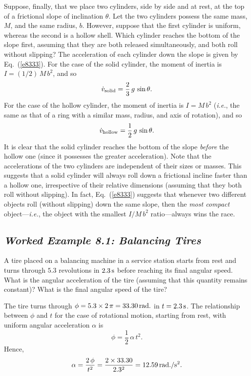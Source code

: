 Suppose, finally, that we place two cylinders, side by side and at rest, at the top of a
frictional  slope
of inclination $\theta$. Let the two cylinders possess the same mass, $M$, and the
same radius, $b$. However, suppose that the first cylinder is uniform, whereas the
second is a hollow shell. Which cylinder reaches the bottom of the slope first, assuming that they are
both released simultaneously, and both roll without slipping? 
The acceleration of each cylinder down the slope is given by Eq.~(\ref{e8333}).
For the case of the solid cylinder, the moment of inertia is $I=(1/2)\,M\,b^2$,
and so
\begin{equation}
\dot{v}_{\rm solid} = \frac{2}{3}\,g\,\sin\theta.
\end{equation}
For the case of the hollow cylinder, the moment of inertia is  $I=M\,b^2$ ({\em i.e.},
the same as that of a ring with a similar mass, radius, and axis of rotation),
and so
\begin{equation}
\dot{v}_{\rm hollow} = \frac{1}{2}\,g\,\sin\theta.
\end{equation}
It is clear that the solid cylinder reaches the bottom of the slope {\em before} the
hollow one (since it possesses the greater acceleration). Note that the
accelerations of the two cylinders are independent of their sizes or masses. This
suggests that a solid cylinder will always roll down a frictional incline faster
than a hollow one, irrespective of their relative dimensions (assuming that they
both roll without slipping). In fact, Eq.~(\ref{e8333}) suggests that whenever two
different objects roll (without slipping) down the same slope,
then the {\em most compact} object---{\em i.e.}, the object
with the smallest $I/M\,b^2$ ratio---always wins the race.

\subsection*{\em Worked Example 8.1: Balancing Tires}
 A tire placed on a balancing machine in a
service station starts from rest and turns through $5.3$ revolutions
in $2.3\,{\rm s}$ before reaching its final angular speed. What is the
angular acceleration of the tire (assuming that this quantity remains constant)?
What is the final angular speed of the tire?

 The tire turns through $\phi=5.3\times 2\,\pi = 33.30\,{\rm rad.}$
in $t=2.3\,{\rm s}$. The relationship between $\phi$ and $t$ for the case of rotational
motion, starting from
rest,
with uniform angular acceleration $\alpha$ is
$$
\phi = \frac{1}{2}\,\alpha\,t^2.
$$
Hence,
$$
\alpha = \frac{2\,\phi}{t^2} = \frac{2\times 33.30}{2.3^2} = 12.59\, {\rm rad./s^2}.
$$

